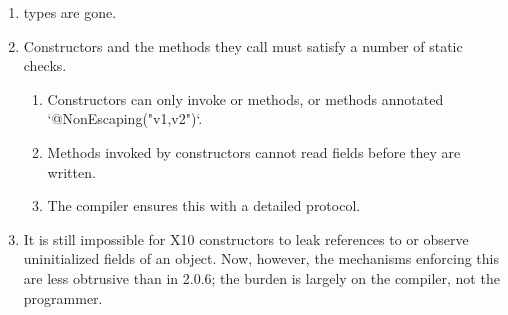 \begin{enumerate}
\item {} types are gone.
\item Constructors and the methods they call must satisfy a number of static
      checks.  
    
    \begin{enumerate}
    \item Constructors can only invoke  or  methods, 
          or methods annotated \xcd`@NonEscaping("v1,v2")`.  
    \item Methods invoked by constructors cannot read fields before they are
          written. 
    \item The compiler ensures this with a detailed protocol. 
    \end{enumerate}

\item It is still impossible for X10 constructors to leak references to
       or observe uninitialized fields of an object.  Now, however,
      the mechanisms enforcing this are less obtrusive than in 2.0.6; the
      burden is largely on the compiler, not the programmer.
\end{enumerate}




